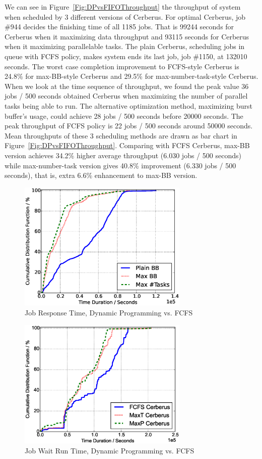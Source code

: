 We can see in Figure~\ref{Fig:DPvsFIFOThroughput} the throughput of system
when scheduled by 3 different versions of Cerberus.
For optimal Cerberus, job \#944 decides the finishing time of all 1185 jobs.
That is 99244 seconds for Cerberus when it maximizing data throughput
and 93115 seconds for Cerberus when it maximizing parallelable tasks.
The plain Cerberus, scheduling jobs in queue with FCFS policy,
makes system ends its last job, job \#1150, at 132010 seconds.
The worst case completion improvement to FCFS-style Cerberus is
24.8\% for max-BB-style Cerberus and 29.5\% for max-number-task-style Cerberus.
When we look at the time sequence of throughput,
we found the peak value 36 jobs / 500 seconds obtained Cerberus
when maximizing the number of parallel tasks being able to run.
The alternative optimization method, maximizing burst buffer's usage,
could achieve 28 jobs / 500 seconds before 20000 seconds.
The peak throughput of FCFS policy is 22 jobs / 500 seconds around 50000 seconds.
Mean throughputs of these 3 scheduling methods are drawn
as bar chart in Figure~\ref{Fig:DPvsFIFOThroughput}.
Comparing with FCFS Cerberus, max-BB version achieves
34.2\% higher average throughput (6.030 jobs / 500 seconds)
while max-number-task version gives 40.8\% improvement (6.330 jobs / 500 seconds),
that is, extra 6.6\% enhancement to max-BB version.


\begin{figure}[!t]
        \centering
        \includegraphics[width=3.2in]{DrawDPvsFIFO/1000jobs_dp_vs_fifo_response}
        \caption{Job Response Time, Dynamic Programming vs. FCFS}
        \label{Fig:DPvsFIFOResponse}
\end{figure}

\begin{figure}[!t]
        \centering
        \includegraphics[width=3.2in]{DrawDPvsFIFO/1000jobs_dp_vs_fifo_wait_run}
        \caption{Job Wait Run Time, Dynamic Programming vs. FCFS}
        \label{Fig:DPvsFIFOWaitRun}
\end{figure}

